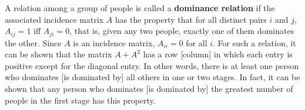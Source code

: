 \begin{eg}\label{2.3.11}
  A relation among a group of people is called a \textbf{dominance relation} if the associated incidence matrix \(A\) has the property that for all distinct pairs \(i\) and \(j\), \(A_{i j} = 1\) iff \(A_{j i} = 0\), that is, given any two people, exactly one of them dominates the other.
  Since \(A\) is an incidence matrix, \(A_{i i} = 0\) for all \(i\).
  For such a relation, it can be shown that the matrix \(A + A^2\) has a row [column] in which each entry is positive except for the diagonal entry.
  In other words, there is at least one person who dominates [is dominated by] all others in one or two stages.
  In fact, it can be shown that any person who dominates [is dominated by] the greatest number of people in the first stage has this property.
\end{eg}


